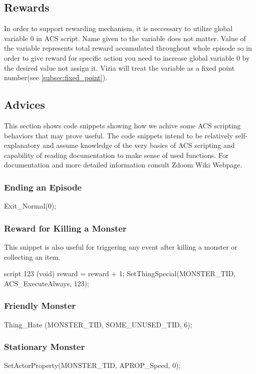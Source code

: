 	\subsection{Rewards}
		In order to support rewarding mechanism, it is neccessary to utilize global variable 0 in ACS script. Name given to the variable does not matter. Value of the variable represents total reward accumulated throughout whole episode so in order to give reward for specific action you need to increase global variable 0 by the desired value not assign it. Vizia will treat the variable as a fixed point number(see \ref{subsec:fixed_point}).

	\subsection{Advices}
		This section shows code snippets showing how we achive some ACS scripting behaviors that may prove useful. The code snippets intend to be relatively self-explanatory and assume knowledge of the very basics of ACS scripting and capability of reading documentation to make sense of used functions. For documentation and more detailed information consult Zdoom Wiki Webpage\cite{zdoom-wiki}.

		\subsubsection*{Ending an Episode}

			\begin{clinee}
Exit_Normal(0);
			\end{clinee}
		\subsubsection*{Reward for Killing a Monster} This snippet is also useful for triggering any event after killing a monster or collecting an item.
			\begin{clinee}
script 123 (void)
{
	reward = reward + 1;
}
SetThingSpecial(MONSTER_TID, ACS_ExecuteAlways, 123);
			\end{clinee}
\subsubsection*{Friendly Monster}
			\begin{clinee}
Thing_Hate (MONSTER_TID, SOME_UNUSED_TID, 6);
			\end{clinee}
		\subsubsection*{Stationary Monster}
			\begin{clinee}
SetActorProperty(MONSTER_TID, APROP_Speed, 0);
			\end{clinee}
